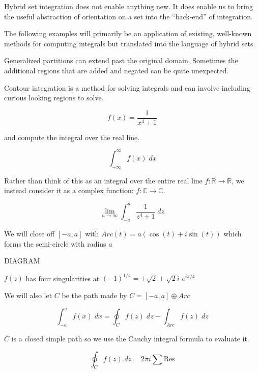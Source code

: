 Hybrid set integration does not enable anything new.
It does enable us to bring the useful abstraction of orientation on a set into the ``back-end'' of integration.

The following examples will primarily be an application of existing, well-known methods for computing integrals but 
translated into the language of hybrid sets.

Generalized partitions can extend past the original domain. 
Sometimes the additional regions that are added and negated can be quite unexpected.


Contour integration is a method for solving integrals and can involve including curious looking regions to solve.

\begin{equation}
	f(x) = \frac{1}{x^4 + 1}
\end{equation}

and compute the integral over the real line.

\begin{equation}
	 \int_{-\infty}^\infty f(x) \; dx
\end{equation}

Rather than think of this as an integral over the entire real line $f:\mathbb{R} \to \mathbb{R}$, 
we instead consider it as a complex function: $f:\mathbb{C} \to \mathbb{C}$.

\begin{equation}
	\lim_{a\to \infty} \int_{-a}^a \frac{1}{z^4+1} \; dz
\end{equation}

We will close off $[-a, a]$ with $Arc(t) = a ( \cos(t) + i \sin(t))$ which forms the semi-circle with radius $a$

DIAGRAM

$f(z)$ has four singularities at $(-1)^{1/4} =  \pm \sqrt{2} \pm \sqrt{2}i$
$e^{i \pi/4} $


We will also let $C$ be the path made by $C= [-a, a] \oplus Arc$ 

\begin{equation}
	\int_{-a}^a f(x)\;dx = \oint_{C} f(z)\;dz - \int_{Arc} f(z) \; dz
\end{equation}

$C$ is a closed simple path so we use the Cauchy integral formula to evaluate it.

\begin{equation}
	\oint_C f(z) \;dz = 2 \pi i \sum \text{Res}
\end{equation}

